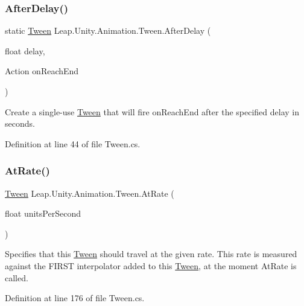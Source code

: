 \subsubsection{\texorpdfstring{AfterDelay()}{AfterDelay()}}
{\footnotesize\ttfamily static \mbox{\hyperlink{struct_leap_1_1_unity_1_1_animation_1_1_tween}{Tween}} Leap.\+Unity.\+Animation.\+Tween.\+After\+Delay (\begin{DoxyParamCaption}\item[{float}]{delay,  }\item[{Action}]{on\+Reach\+End }\end{DoxyParamCaption})\hspace{0.3cm}{\ttfamily [static]}}



Create a single-\/use \mbox{\hyperlink{struct_leap_1_1_unity_1_1_animation_1_1_tween}{Tween}} that will fire on\+Reach\+End after the specified delay in seconds. 



Definition at line 44 of file Tween.\+cs.

\mbox{\label{struct_leap_1_1_unity_1_1_animation_1_1_tween_a8a9610fdde3d806fdd7ca4c6e06f1645}} 
\subsubsection{\texorpdfstring{AtRate()}{AtRate()}}
{\footnotesize\ttfamily \mbox{\hyperlink{struct_leap_1_1_unity_1_1_animation_1_1_tween}{Tween}} Leap.\+Unity.\+Animation.\+Tween.\+At\+Rate (\begin{DoxyParamCaption}\item[{float}]{units\+Per\+Second }\end{DoxyParamCaption})}



Specifies that this \mbox{\hyperlink{struct_leap_1_1_unity_1_1_animation_1_1_tween}{Tween}} should travel at the given rate. This rate is measured against the F\+I\+R\+ST interpolator added to this \mbox{\hyperlink{struct_leap_1_1_unity_1_1_animation_1_1_tween}{Tween}}, at the moment At\+Rate is called. 



Definition at line 176 of file Tween.\+cs.

\mbox{\label{struct_leap_1_1_unity_1_1_animation_1_1_tween_ac971360d59e189a9b5f788f1c881969c}} 
